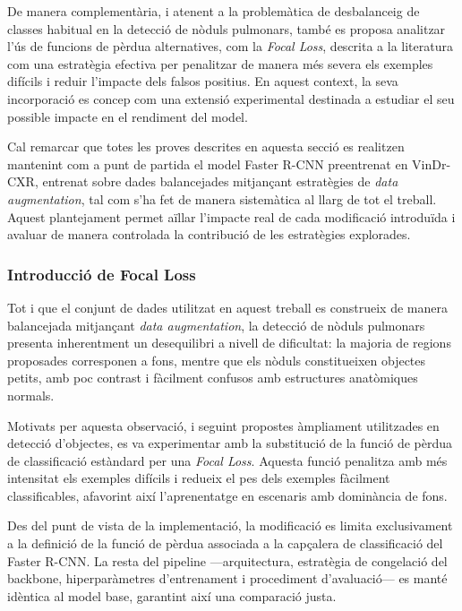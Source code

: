 \documentclass[conference]{IEEEtran}
\begin{document}
De manera complementària, i atenent a la problemàtica de desbalanceig de classes 
habitual en la detecció de nòduls pulmonars, també es proposa analitzar l’ús de 
funcions de pèrdua alternatives, com la \textit{Focal Loss}, descrita a la 
literatura com una estratègia efectiva per penalitzar de manera més severa 
els exemples difícils i reduir l’impacte dels falsos positius. En aquest context, 
la seva incorporació es concep com una extensió experimental destinada a estudiar 
el seu possible impacte en el rendiment del model.

Cal remarcar que totes les proves descrites en aquesta secció es realitzen 
mantenint com a punt de partida el model Faster R-CNN preentrenat en VinDr-CXR, 
entrenat sobre dades balancejades mitjançant estratègies de \textit{data 
augmentation}, tal com s’ha fet de manera sistemàtica al llarg de tot el treball. 
Aquest plantejament permet aïllar l’impacte real de cada modificació introduïda 
i avaluar de manera controlada la contribució de les estratègies explorades.




\subsubsection{Introducció de Focal Loss}

Tot i que el conjunt de dades utilitzat en aquest treball es construeix de manera
balancejada mitjançant \textit{data augmentation}, la detecció de nòduls pulmonars
presenta inherentment un desequilibri a nivell de dificultat: la majoria de regions
proposades corresponen a fons, mentre que els nòduls constitueixen objectes petits,
amb poc contrast i fàcilment confusos amb estructures anatòmiques normals.

Motivats per aquesta observació, i seguint propostes àmpliament utilitzades en detecció
d’objectes, es va experimentar amb la substitució de la funció de pèrdua de classificació
estàndard per una \textit{Focal Loss}. Aquesta funció penalitza amb més intensitat els
exemples difícils i redueix el pes dels exemples fàcilment classificables, afavorint així
l’aprenentatge en escenaris amb dominància de fons.

Des del punt de vista de la implementació, la modificació es limita exclusivament a la
definició de la funció de pèrdua associada a la capçalera de classificació del Faster
R-CNN. La resta del pipeline —arquitectura, estratègia de congelació del backbone,
hiperparàmetres d’entrenament i procediment d’avaluació— es manté idèntica al model
base, garantint així una comparació justa.
\end{document}
